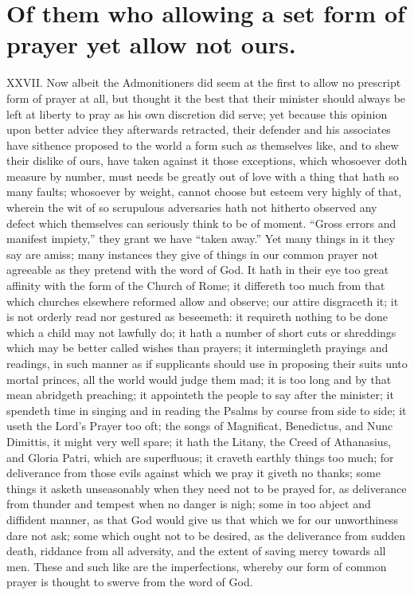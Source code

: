 \section*{Of them who allowing a set form of prayer yet allow not ours.}
XXVII. Now albeit the Admonitioners did seem at the first to allow no prescript form of prayer at all, but thought it the best that their minister should always be left at liberty to pray as his own discretion did serve; yet because this opinion upon better advice they afterwards retracted, their defender and his associates have sithence proposed to the world a form such as themselves like, and to shew their dislike of ours, have taken against it those exceptions, which whosoever doth measure by number, must needs be greatly out of love with a thing that hath so many faults; whosoever by weight, cannot choose but esteem very highly of that, wherein the wit of so scrupulous adversaries hath not hitherto observed any defect which themselves can seriously think to be of moment. “Gross errors and manifest impiety,” they  grant we have “taken away.” Yet many things in it they say are amiss; many instances they give of things in our common prayer not agreeable as they pretend with the word of God. It hath in their eye too great affinity with the form of the Church of Rome; it differeth too much from that which churches elsewhere reformed allow and observe; our attire disgraceth it; it is not orderly read nor gestured as beseemeth: it requireth nothing to be done which a child may not lawfully do; it hath a number of short cuts or shreddings which may be better called wishes than prayers; it intermingleth prayings and readings, in such manner as if supplicants should use in proposing their suits unto mortal princes, all the world would judge them mad; it is too long and by that mean abridgeth preaching; it appointeth the people to say after the minister; it spendeth time in singing and in reading the Psalms by course from side to side; it useth the Lord’s Prayer too oft; the songs of Magnificat, Benedictus, and Nunc Dimittis, it might very well spare; it hath the Litany, the Creed of Athanasius, and Gloria Patri, which are superfluous; it craveth earthly things too much; for deliverance from those evils against which we pray it giveth no thanks; some things it asketh unseasonably when they need not to be prayed for, as deliverance from thunder and tempest when no danger is nigh; some in too abject and diffident manner, as that God would give us that which we for our unworthiness dare not ask; some which ought not to be desired, as the deliverance from sudden death, riddance from all adversity, and the extent of saving  mercy towards all men.
 These and such like are the imperfections, whereby our form of common prayer is thought to swerve from the word of God.

